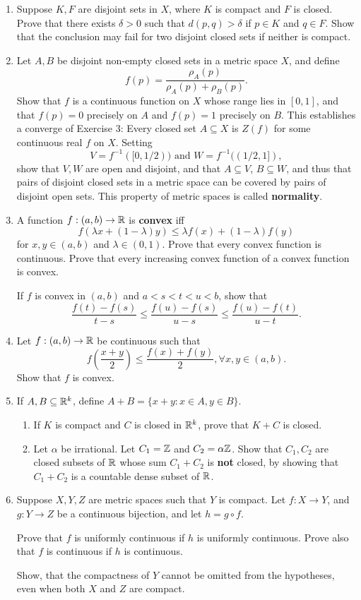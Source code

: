 \begin{enumerate}
\item %
Suppose $K, F$ are disjoint sets in $X$, where $K$ is compact and $F$ is closed. Prove that there exists $\delta > 0$ such that $d(p, q) > \delta$ if $p \in K$ and $q \in F$. Show that the conclusion may fail for two disjoint closed sets if neither is compact.

\item %
Let $A, B$ be disjoint non-empty closed sets in a metric space $X$, and define
\[
    f(p) = \frac{\rho_A(p)}{\rho_A(p) + \rho_B(p)}.
\]
Show that $f$ is a continuous function on $X$ whose range lies in $[0, 1]$, and that $f(p) = 0$ precisely on $A$ and $f(p) = 1$ precisely on $B$. This establishes a converge of Exercise 3: Every closed set $A \subseteq X$ is $Z(f)$ for some continuous real $f$ on $X$. Setting 
\[
    V = f^{-1}([0, 1/2)) \text{ and } W = f^{-1}((1/2, 1]),
\]
show that $V, W$ are open and disjoint, and that $A \subseteq V$, $B \subseteq W$, and thus that pairs of disjoint closed sets in a metric space can be covered by pairs of disjoint open sets. This property of metric spaces is called \textbf{normality}.

\item %
A function $f: (a, b) \rightarrow \mathbb{R}$ is \textbf{convex} iff
\[
    f(\lambda x + (1 - \lambda) y) \le \lambda f(x) + (1 - \lambda) f(y)
\]
for $x, y \in (a, b)$ and $\lambda \in (0, 1)$. Prove that every convex function is continuous. Prove that every increasing convex function of a convex function is convex.

If $f$ is convex in $(a, b)$ and $a < s < t < u < b$, show that
\[
    \frac{f(t) - f(s)}{t - s} \le \frac{f(u) - f(s)}{u - s} \le \frac{f(u) - f(t)}{u - t}.
\]

\item %
Let $f: (a, b) \rightarrow \mathbb{R}$ be continuous such that
\[
    f\left(\frac{x+y}{2}\right) \le \frac{f(x) + f(y)}{2}, \forall x, y \in (a, b).
\]
Show that $f$ is convex.

\item %
If $A, B \subseteq \mathbb{R}^k$, define $A + B = \{x + y: x \in A, y \in B\}$.
\begin{enumerate}
\item If $K$ is compact and $C$ is closed in $\mathbb{R}^k$, prove that $K + C$ is closed.
\item Let $\alpha$ be irrational. Let $C_1 = \mathbb{Z}$ and $C_2 = \alpha\mathbb{Z}$. Show that $C_1, C_2$ are closed subsets of $\mathbb{R}$ whose sum $C_1 + C_2$ is \textbf{not} closed, by showing that $C_1 + C_2$ is a countable dense subset of $\mathbb{R}$.
\end{enumerate}

\item %
Suppose $X, Y, Z$ are metric spaces such that $Y$ is compact. Let $f: X \to Y$, and $g: Y \to Z$ be a continuous bijection, and let $h = g \circ f$.

Prove that $f$ is uniformly continuous if $h$ is uniformly continuous. Prove also that $f$ is continuous if $h$ is continuous. 

Show, that the compactness of $Y$ cannot be omitted from the hypotheses, even when both $X$ and $Z$ are compact.
\end{enumerate}
